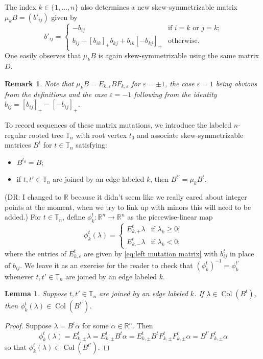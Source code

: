 \documentclass{amsart}
\newtheorem{lemma}[theorem]{Lemma}
\newtheorem{remark}[theorem]{Remark}
\numberwithin{theorem}{section}
\newcommand{\RR}{\mathbb{R}}
\newcommand{\TT}{\mathbb{T}}
\newcommand{\Col}{\operatorname{Col}}
\begin{document}
  The index $k\in\{1,\ldots,n\}$ also determines a new skew-symmetrizable matrix $\mu_kB=(b'_{ij})$ given by
  \[ b'_{ij}=\begin{cases} -b_{ij} & \text{if $i=k$ or $j=k$;}\\ b_{ij}+[b_{ik}]_+b_{kj}+b_{ik}[-b_{kj}]_+ & \text{otherwise.} \end{cases} \]
  One easily observes that $\mu_k B$ is again skew-symmetrizable using the same matrix $D$.
  \begin{remark}
    Note that $\mu_k B=E_{k,\varepsilon} B F_{k,\varepsilon}$ for $\varepsilon=\pm 1$, the case $\varepsilon=1$ being obvious from the definitions and the case $\varepsilon=-1$ following from the identity $b_{ij}=[b_{ij}]_+-[-b_{ij}]_+$.
  \end{remark}

  To record sequences of these matrix mutations, we introduce the labeled $n$-regular rooted tree $\TT_n$ with root vertex $t_0$ and associate skew-symmetrizable matrices $B^t$ for $t\in\TT_n$ satisfying:
  \begin{itemize}
    \item $B^{t_0}=B$;
    \item if $t,t'\in\TT_n$ are joined by an edge labeled $k$, then $B^{t'}=\mu_k B^t$.
  \end{itemize}

  (DR: I changed to $\RR$ because it didn't seem like we really cared about integer points at the moment, when we try to link up with minors this will need to be added.)
  For $t\in\TT_n$, define $\phi^t_k:\RR^n\to\RR^n$ as the piecewise-linear map
  \[\phi^t_k(\lambda)=\begin{cases} E^t_{k,+}\lambda & \text{if $\lambda_k\ge0$;}\\ E^t_{k,-}\lambda & \text{if $\lambda_k<0$;} \end{cases}\]
  where the entries of $E^t_{k,\varepsilon}$ are given by \eqref{eq:left mutation matrix} with $b^t_{ij}$ in place of $b_{ij}$.
  We leave it as an exercise for the reader to check that $(\phi^t_k)^{-1}=\phi^{t'}_k$ whenever $t,t'\in\TT_n$ are joined by an edge labeled $k$.
  \begin{lemma}
    Suppose $t,t'\in\TT_n$ are joined by an edge labeled $k$.
    If $\lambda\in\Col(B^t)$, then $\phi^t_k(\lambda)\in\Col(B^{t'})$.
  \end{lemma}
  \begin{proof}
    Suppose $\lambda=B^t\alpha$ for some $\alpha\in\RR^n$.
    Then 
    \[\phi^t_k(\lambda)=E^t_{k,\pm}\lambda=E^t_{k,\pm} B^t\alpha=E^t_{k,\pm} B^t F^t_{k,\pm} F^t_{k,\pm}\alpha=B^{t'} F^t_{k,\pm}\alpha\]
    so that $\phi^t_k(\lambda)\in\Col(B^{t'})$.
  \end{proof}
\end{document}
